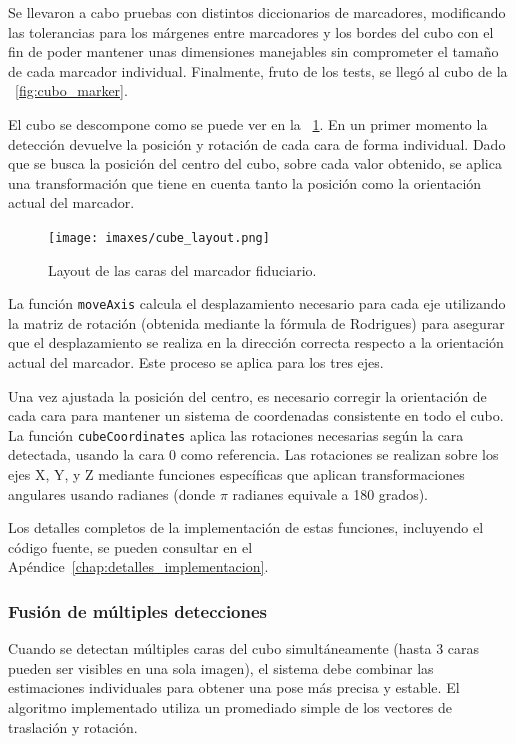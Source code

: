 Se llevaron a cabo pruebas con distintos diccionarios de marcadores, modificando las tolerancias para los márgenes entre marcadores y los bordes del cubo con el fin de poder mantener unas dimensiones manejables sin comprometer el tamaño de cada marcador individual.
Finalmente, fruto de los tests, se llegó al cubo de la \figurename~\ref{fig:cubo_marker}.

El cubo se descompone como se puede ver en la \figurename~\ref{fig:cube_layout}. En un primer momento la detección devuelve la posición y rotación de cada cara de forma individual. Dado que se busca la posición del centro del cubo, sobre cada valor obtenido, se aplica una transformación que tiene en cuenta tanto la posición como la orientación actual del marcador. 

\begin{figure}
	\centering
	\texttt{[image: imaxes/cube\_layout.png]}
	\caption{Layout de las caras del marcador fiduciario.}
	\label{fig:cube_layout}
\end{figure}

La función \texttt{moveAxis} calcula el desplazamiento necesario para cada eje utilizando la matriz de rotación (obtenida mediante la fórmula de Rodrigues) para asegurar que el desplazamiento se realiza en la dirección correcta respecto a la orientación actual del marcador. Este proceso se aplica para los tres ejes.

Una vez ajustada la posición del centro, es necesario corregir la orientación de cada cara para mantener un sistema de coordenadas consistente en todo el cubo. La función \texttt{cubeCoordinates} aplica las rotaciones necesarias según la cara detectada, usando la cara 0 como referencia. Las rotaciones se realizan sobre los ejes X, Y, y Z mediante funciones específicas que aplican transformaciones angulares usando radianes (donde $\pi$ radianes equivale a 180 grados).

Los detalles completos de la implementación de estas funciones, incluyendo el código fuente, se pueden consultar en el Apéndice~\ref{chap:detalles_implementacion}.

\subsubsection{Fusión de múltiples detecciones}
Cuando se detectan múltiples caras del cubo simultáneamente (hasta 3 caras pueden ser visibles en una sola imagen), el sistema debe combinar las estimaciones individuales para obtener una pose más precisa y estable. El algoritmo implementado utiliza un promediado simple de los vectores de traslación y rotación.

